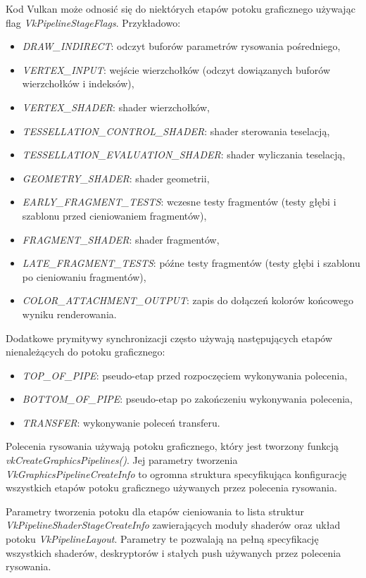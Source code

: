 Kod Vulkan może odnosić się do niektórych etapów potoku graficznego używając flag \textit{VkPipelineStageFlags}.
Przykładowo:
\begin{itemize}
	\item \textit{DRAW\_INDIRECT}: odczyt buforów parametrów rysowania pośredniego,
	\item \textit{VERTEX\_INPUT}: wejście wierzchołków (odczyt dowiązanych buforów wierzchołków i indeksów),
	\item \textit{VERTEX\_SHADER}: shader wierzchołków,
	\item \textit{TESSELLATION\_CONTROL\_SHADER}: shader sterowania teselacją,
	\item \textit{TESSELLATION\_EVALUATION\_SHADER}: shader wyliczania teselacją,
	\item \textit{GEOMETRY\_SHADER}: shader geometrii,
	\item \textit{EARLY\_FRAGMENT\_TESTS}: wczesne testy fragmentów (testy głębi i szablonu przed cieniowaniem fragmentów),
	\item \textit{FRAGMENT\_SHADER}: shader fragmentów,
	\item \textit{LATE\_FRAGMENT\_TESTS}: późne testy fragmentów (testy głębi i szablonu po cieniowaniu fragmentów),
	\item \textit{COLOR\_ATTACHMENT\_OUTPUT}: zapis do dołączeń kolorów końcowego wyniku renderowania.
\end{itemize}
Dodatkowe prymitywy synchronizacji często używają następujących etapów nienależących do potoku graficznego:
\begin{itemize}
	\item \textit{TOP\_OF\_PIPE}: pseudo-etap przed rozpoczęciem wykonywania polecenia,
	\item \textit{BOTTOM\_OF\_PIPE}: pseudo-etap po zakończeniu wykonywania polecenia,
	\item \textit{TRANSFER}: wykonywanie poleceń transferu.
\end{itemize}

Polecenia rysowania używają potoku graficznego, który jest tworzony funkcją \textit{vkCreateGraphicsPipelines()}. Jej parametry tworzenia \textit{VkGraphicsPipelineCreateInfo} to ogromna struktura specyfikująca konfigurację wszystkich etapów potoku graficznego używanych przez polecenia rysowania.

Parametry tworzenia potoku dla etapów cieniowania to lista struktur \textit{VkPipelineShaderStageCreateInfo} zawierających moduły shaderów oraz układ potoku \textit{VkPipelineLayout}. Parametry te pozwalają na pełną specyfikację wszystkich shaderów, deskryptorów i stałych push używanych przez polecenia rysowania.

